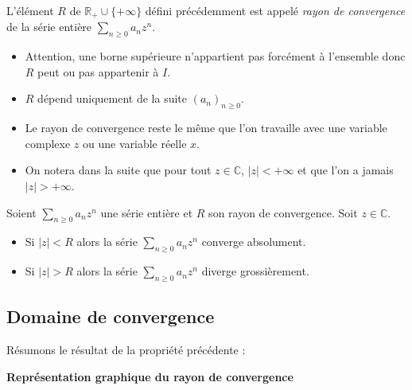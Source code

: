 \documentclass[french,11pt,twoside]{VcCours}
\begin{document}
\begin{Definition}{} L'élément $R$ de $\mathbb{R}_+ \cup \lbrace + \infty \rbrace$ défini précédemment est appelé \emph{rayon de convergence} de la série entière $\sum_{n \geq 0} a_n z^n$.
\end{Definition}

\begin{Remarques}{}
\begin{itemize}
\item Attention, une borne supérieure n'appartient pas forcément à l'ensemble donc $R$ peut ou pas appartenir à $I$.
\item $R$ dépend uniquement de la suite $(a_n)_{n \geq 0}$.
\item Le rayon de convergence reste le même que l'on travaille avec une variable complexe $z$ ou une variable réelle $x$.
\item On notera dans la suite que pour tout $z \in \mathbb{C}$, $ \vert z \vert < + \infty$ et que l'on a jamais $\vert z \vert > + \infty$.
\end{itemize}
\end{Remarques}

\begin{Proposition}{} Soient $\sum_{n \geq 0} a_n z^n$ une série entière et $R$ son rayon de convergence. Soit $z \in \mathbb{C}$.

\begin{itemize}
\item Si $\vert z \vert < R$ alors la série $\sum_{n \geq 0} a_n z^n$ converge absolument.
\item Si $\vert z \vert > R$ alors la série $\sum_{n \geq 0} a_n z^n$ diverge grossièrement.
\end{itemize}
\end{Proposition}

\begin{Demonstration}{}
\vspace{3cm}
\end{Demonstration}

\subsection{Domaine de convergence}
Résumons le résultat de la propriété précédente : 

\begin{center}
\textbf{Représentation graphique du rayon de convergence}
\end{center}

\vspace{4cm}
\end{document}
